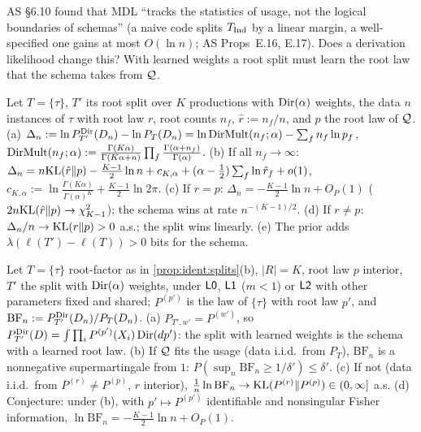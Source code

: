 AS \S6.10 found that MDL ``tracks the statistics of usage, not the logical boundaries of schemas'' (a naive code splits $T_{\mathrm{Ind}}$ by a linear margin, a well-specified one gains at most $O(\ln n)$; AS Props~E.16, E.17). Does a derivation likelihood change this? With learned weights a root split must learn the root law that the schema takes from $\mathcal{Q}$.

\begin{proposition}\label{prop:ident:splitlzero}
Let $T=\{\tau\}$, $T'$ its root split over $K$ productions with $\mathrm{Dir}(\alpha)$ weights, the data $n$ instances of $\tau$ with root law $r$, root counts $n_f$, $\hat r:=n_f/n$, and $p$ the root law of $\mathcal{Q}$.
(a) $\Delta_n:=\ln P^{\mathrm{Dir}}_{T'}(D_n)-\ln P_T(D_n)=\ln\mathrm{DirMult}(n_f;\alpha)-\sum_fn_f\ln p_f$, $\mathrm{DirMult}(n_f;\alpha):=\frac{\Gamma(K\alpha)}{\Gamma(K\alpha+n)}\prod_f\frac{\Gamma(\alpha+n_f)}{\Gamma(\alpha)}$.
(b) If all $n_f\to\infty$: $\Delta_n=n\mathrm{KL}(\hat r\|p)-\frac{K-1}2\ln n+c_{K,\alpha}+(\alpha-\frac12)\sum_f\ln\hat r_f+o(1)$, $c_{K,\alpha}:=\ln\frac{\Gamma(K\alpha)}{\Gamma(\alpha)^K}+\frac{K-1}2\ln2\pi$.
(c) If $r=p$: $\Delta_n=-\frac{K-1}2\ln n+O_P(1)$ ($2n\mathrm{KL}(\hat r\|p)\to\chi^2_{K-1}$); the schema wins at rate $n^{-(K-1)/2}$.
(d) If $r\ne p$: $\Delta_n/n\to\mathrm{KL}(r\|p)>0$ a.s.; the split wins linearly.
(e) The prior adds $\lambda(\ell(T')-\ell(T))>0$ bits for the schema.
\end{proposition}

\begin{proposition}\label{prop:ident:splitlone}
Let $T=\{\tau\}$ root-factor as in \cref{prop:ident:splits}(b), $|R|=K$, root law $p$ interior, $T'$ the split with $\mathrm{Dir}(\alpha)$ weights, under $\mathord{\mathsf{L0}}$, $\mathord{\mathsf{L1}}$ ($m<1$) or $\mathord{\mathsf{L2}}$ with other parameters fixed and shared; $P^{(p')}$ is the law of $\{\tau\}$ with root law $p'$, and $\mathrm{BF}_n:=P^{\mathrm{Dir}}_{T'}(D_n)/P_T(D_n)$.
(a) $P_{T',w'}=P^{(w')}$, so $P^{\mathrm{Dir}}_{T'}(D)=\int\prod_iP^{(p')}(X_i)\,\mathrm{Dir}(dp')$: the split with learned weights is the schema with a learned root law.
(b) If $\mathcal{Q}$ fits the usage (data i.i.d.\ from $P_T$), $\mathrm{BF}_n$ is a nonnegative supermartingale from $1$: $P(\sup_n\mathrm{BF}_n\ge1/\delta')\le\delta'$.
(c) If not (data i.i.d.\ from $P^{(r)}\ne P^{(p)}$, $r$ interior), $\frac1n\ln\mathrm{BF}_n\to\mathrm{KL}(P^{(r)}\|P^{(p)})\in(0,\infty]$ a.s.
(d) Conjecture: under (b), with $p'\mapsto P^{(p')}$ identifiable and nonsingular Fisher information, $\ln\mathrm{BF}_n=-\frac{K-1}2\ln n+O_P(1)$.
\end{proposition}

